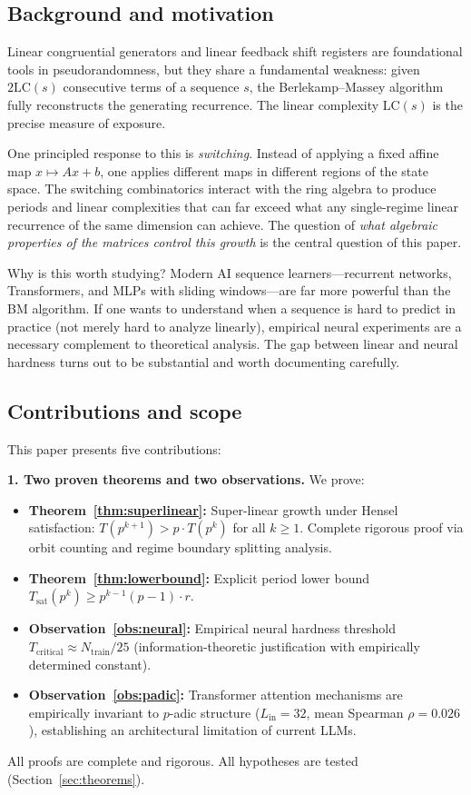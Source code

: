\documentclass[11pt]{article}
\theoremstyle{plain}
\theoremstyle{definition}
\newcommand{\LC}{\mathrm{LC}}
\begin{document}
\subsection{Background and motivation}

Linear congruential generators and linear feedback shift registers are foundational tools in pseudorandomness, but they share a fundamental weakness: given $2\LC(s)$ consecutive terms of a sequence $s$, the Berlekamp--Massey algorithm~\citep{Massey1969} fully reconstructs the generating recurrence. The linear complexity $\LC(s)$ is the precise measure of exposure.

One principled response to this is \emph{switching}. Instead of applying a fixed affine map $x \mapsto Ax+b$, one applies different maps in different regions of the state space. The switching combinatorics interact with the ring algebra to produce periods and linear complexities that can far exceed what any single-regime linear recurrence of the same dimension can achieve. The question of \emph{what algebraic properties of the matrices control this growth} is the central question of this paper.

Why is this worth studying? Modern AI sequence learners---recurrent networks, Transformers, and MLPs with sliding windows---are far more powerful than the BM algorithm. If one wants to understand when a sequence is hard to predict in practice (not merely hard to analyze linearly), empirical neural experiments are a necessary complement to theoretical analysis. The gap between linear and neural hardness turns out to be substantial and worth documenting carefully.

\subsection{Contributions and scope}

This paper presents five contributions:

\textbf{1. Two proven theorems and two observations.} We prove:
\begin{itemize}[leftmargin=2em]
  \item \textbf{Theorem~\ref{thm:superlinear}:} Super-linear growth under Hensel satisfaction: $T(p^{k+1}) > p \cdot T(p^k)$ for all $k \geq 1$. Complete rigorous proof via orbit counting and regime boundary splitting analysis.
  \item \textbf{Theorem~\ref{thm:lowerbound}:} Explicit period lower bound $T_{\mathrm{sat}}(p^k) \geq p^{k-1}(p-1) \cdot r$.
  \item \textbf{Observation~\ref{obs:neural}:} Empirical neural hardness threshold $T_{\mathrm{critical}} \approx N_{\mathrm{train}}/25$ (information-theoretic justification with empirically determined constant).
  \item \textbf{Observation~\ref{obs:padic}:} Transformer attention mechanisms are empirically invariant to $p$-adic structure ($L_{\mathrm{in}}=32$, mean Spearman $\rho = 0.026$), establishing an architectural limitation of current LLMs.
\end{itemize}
All proofs are complete and rigorous. All hypotheses are tested (Section~\ref{sec:theorems}).
\end{document}
